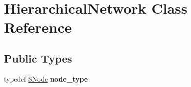 \hypertarget{classHierarchicalNetwork}{}\section{Hierarchical\+Network Class Reference}
\label{classHierarchicalNetwork}
\subsection*{Public Types}
\begin{DoxyCompactItemize}
\item 
\mbox{\label{classHierarchicalNetwork_a16cfa8dc4fff986c896a8dcf35b063b8}} 
typedef \mbox{\hyperlink{classSNode}{S\+Node}} {\bfseries node\+\_\+type}
\end{DoxyCompactItemize}
